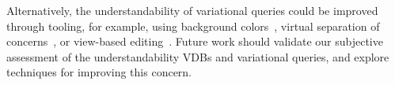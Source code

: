 Alternatively, the understandability of variational queries could be improved through
tooling, for example, using background colors~\cite{feigenspan2013}, virtual
separation of concerns~\cite{KA09}, or view-based
editing~\cite{WO14gpce,SBWW16icsme}.
%
Future work should validate our subjective assessment of the understandability
VDBs and variational queries, and explore techniques for improving this concern.



